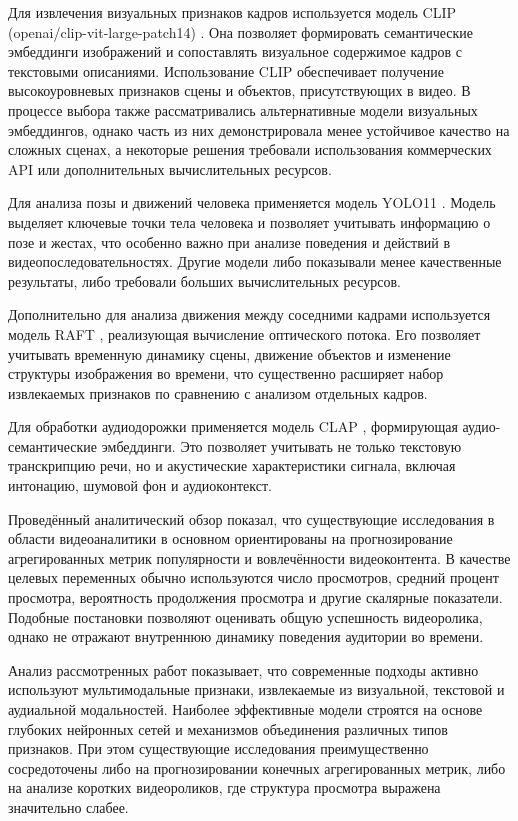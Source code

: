 \documentclass[times]{itmo-student-thesis}
\begin{document}
Для извлечения визуальных признаков кадров используется модель CLIP (openai/clip-vit-large-patch14) \cite{radford2021clip}. Она позволяет формировать семантические эмбеддинги изображений и сопоставлять визуальное содержимое кадров с текстовыми описаниями. Использование CLIP обеспечивает получение высокоуровневых признаков сцены и объектов, присутствующих в видео. В процессе выбора также рассматривались альтернативные модели визуальных эмбеддингов, однако часть из них демонстрировала менее устойчивое качество на сложных сценах, а некоторые решения требовали использования коммерческих API или дополнительных вычислительных ресурсов.

Для анализа позы и движений человека применяется модель YOLO11 \cite{ultralytics2026yolo11}. Модель выделяет ключевые точки тела человека и позволяет учитывать информацию о позе и жестах, что особенно важно при анализе поведения и действий в видеопоследовательностях. Другие модели либо показывали менее качественные результаты, либо требовали больших вычислительных ресурсов.

Дополнительно для анализа движения между соседними кадрами используется модель RAFT \cite{teed2020raft}, реализующая вычисление оптического потока. Его позволяет учитывать временную динамику сцены, движение объектов и изменение структуры изображения во времени, что существенно расширяет набор извлекаемых признаков по сравнению с анализом отдельных кадров.

Для обработки аудиодорожки применяется модель CLAP \cite{elizalde2022clap}, формирующая аудио-семантические эмбеддинги. Это позволяет учитывать не только текстовую транскрипцию речи, но и акустические характеристики сигнала, включая интонацию, шумовой фон и аудиоконтекст.

\chapterconclusion

Проведённый аналитический обзор показал, что существующие исследования в области видеоаналитики в основном ориентированы на прогнозирование агрегированных метрик популярности и вовлечённости видеоконтента. В качестве целевых переменных обычно используются число просмотров, средний процент просмотра, вероятность продолжения просмотра и другие скалярные показатели. Подобные постановки позволяют оценивать общую успешность видеоролика, однако не отражают внутреннюю динамику поведения аудитории во времени.

Анализ рассмотренных работ показывает, что современные подходы активно используют мультимодальные признаки, извлекаемые из визуальной, текстовой и аудиальной модальностей. Наиболее эффективные модели строятся на основе глубоких нейронных сетей и механизмов объединения различных типов признаков. При этом существующие исследования преимущественно сосредоточены либо на прогнозировании конечных агрегированных метрик, либо на анализе коротких видеороликов, где структура просмотра выражена значительно слабее.
\end{document}
